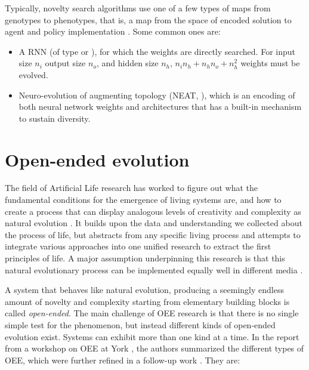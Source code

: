 Typically, novelty search algorithms use one of a few types of maps from
genotypes to phenotypes, that is, a map from the space of encoded solution to
agent and policy implementation
\parencite{mouretEncouragingBehavioralDiversity2012}. Some common ones are:

\begin{itemize}
  \item A \ac{RNN} (of type \cite{elmanFindingStructureTime1990} or
        \cite{jordanSerialOrderParallel1997}), for which the weights are
        directly searched. For input size $n_{i}$ output size $n_{o}$, and
        hidden size $n_{h}$, $n_{i}n_{h} + n_{h}n_{o} + n_{h}^{2}$ weights must
        be evolved.
  \item Neuro-evolution of augmenting topology (NEAT,
        \cite{stanleyEvolvingNeuralNetworks2002}), which is an encoding of both
        neural network weights and architectures that has a built-in mechanism
        to sustain diversity.
\end{itemize}


\section{Open-ended evolution\label{sec:open-ended-evolution-1}}
The field of Artificial Life research has worked to figure out what the
fundamental conditions for the emergence of living systems are, and how to
create a process that can display analogous levels of creativity and complexity
as natural evolution \parencite{eigenHypercycle1979,
  langtonArtificialLifeProceedings1989, dysonOriginsLife1999,
  stanleyWhyOpenEndednessMatters2019, packardOverviewOpenEndedEvolution2019,
  sorosOpenendednessLastGrand2017}. It builds upon the data and understanding we
collected about the process of life, but abstracts from any specific living
process and attempts to integrate various approaches into one unified research
to extract the first principles of life. A major assumption underpinning this
research is that this natural evolutionary process can be implemented equally
well in different media \parencite{dennettDarwinDangerousIdea1996}.

A system that behaves like natural evolution, producing a seemingly endless
amount of novelty and complexity starting from elementary building blocks is
called \emph{open-ended}. The main challenge of \ac{OEE} research is that there is
no single simple test for the phenomenon, but instead different kinds of
open-ended evolution exist. Systems can exhibit more than one kind at a time. In
the report from a workshop on \ac{OEE} at York
\parencite{taylorOpenEndedEvolutionPerspectives2016}, the authors summarized the
different types of \ac{OEE}, which were further refined in a follow-up work
\parencite{packardOverviewOpenEndedEvolution2019}. They are:

